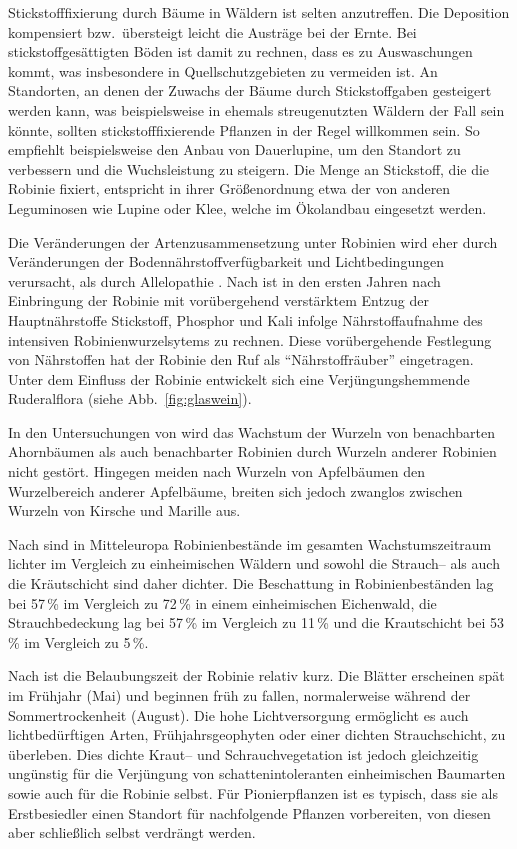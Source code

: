 \documentclass[twocolumn]{scrartcl}
\begin{document}
Stickstofffixierung durch Bäume in Wäldern ist selten anzutreffen.
Die Deposition kompensiert bzw.\ übersteigt leicht die Austräge bei
der Ernte.  Bei stickstoffgesättigten Böden ist damit zu rechnen, dass
es zu Auswaschungen kommt, was insbesondere in Quellschutzgebieten zu
vermeiden ist. An Standorten, an denen der Zuwachs der Bäume durch
Stickstoffgaben gesteigert werden kann, was beispielsweise in ehemals
streugenutzten Wäldern der Fall sein könnte, sollten
stickstofffixierende Pflanzen in der Regel willkommen sein. So
empfiehlt beispielsweise \cite{wiedemann1951ertragskunde} den Anbau
von Dauerlupine, um den Standort zu verbessern und die Wuchsleistung zu
steigern. Die Menge an Stickstoff, die die Robinie fixiert, entspricht
in ihrer Größenordnung etwa der von anderen Leguminosen wie Lupine
oder Klee, welche im Ökolandbau eingesetzt werden.

Die Veränderungen der Artenzusammensetzung unter Robinien wird eher durch
Veränderungen der Bodennährstoffverfügbarkeit und Lichtbedingungen
verursacht, als durch Allelopathie \citep{vitkova2017robinie}. Nach
\cite{mueller1991robinie} ist in den ersten Jahren nach Einbringung
der Robinie mit vorübergehend verstärktem Entzug der Hauptnährstoffe
Stickstoff, Phosphor und Kali infolge Nährstoffaufnahme des intensiven
Robinienwurzelsytems zu rechnen. Diese vorübergehende Festlegung von
Nährstoffen hat der Robinie den Ruf als \enquote{Nährstoffräuber}
eingetragen. Unter dem Einfluss der Robinie entwickelt sich eine
Verjüngungshemmende Ruderalflora (siehe Abb.~\ref{fig:glaswein}).

In den Untersuchungen von
\citet[S.~150--160]{scamoni1952robinieWurzeln} wird das Wachstum der
Wurzeln von benachbarten Ahornbäumen als auch benachbarter Robinien
durch Wurzeln anderer Robinien nicht gestört. Hingegen meiden nach
\citet[S.~53]{kolesnikov1971wurzeln} Wurzeln von Apfelbäumen den
Wurzelbereich anderer Apfelbäume, breiten sich jedoch zwanglos
zwischen Wurzeln von Kirsche und Marille aus.

Nach \cite{hanzelka2015robinie} sind in Mitteleuropa Robinienbestände
im gesamten Wachstumszeitraum lichter im Vergleich zu einheimischen
Wäldern und sowohl die Strauch-- als auch die Kräutschicht sind daher
dichter. Die Beschattung in Robinienbeständen lag bei 57\,\% im
Vergleich zu 72\,\% in einem einheimischen Eichenwald, die
Strauchbedeckung lag bei 57\,\% im Vergleich zu 11\,\% und die
Krautschicht bei 53\,\% im Vergleich zu 5\,\%.

Nach \cite{vitkova2017robinie} ist die Belaubungszeit der Robinie
relativ kurz. Die Blätter erscheinen spät im Frühjahr (Mai) und
beginnen früh zu fallen, normalerweise während der Sommertrockenheit
(August). Die hohe Lichtversorgung ermöglicht es auch lichtbedürftigen
Arten, Frühjahrsgeophyten oder einer dichten Strauchschicht, zu
überleben. Dies dichte Kraut-- und Schrauchvegetation ist jedoch
gleichzeitig ungünstig für die Verjüngung von schattenintoleranten
einheimischen Baumarten sowie auch für die Robinie selbst. Für
Pionierpflanzen ist es typisch, dass sie als Erstbesiedler einen
Standort für nachfolgende Pflanzen vorbereiten, von diesen aber
schließlich selbst verdrängt werden.
\end{document}
